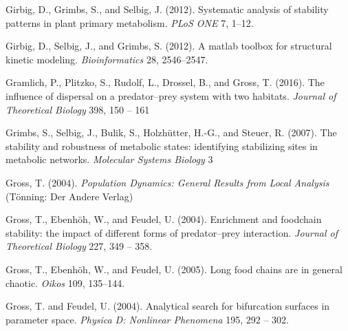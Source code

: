 \documentclass{article}
\begin{document}
\begin{thebibliography}{85}
Girbig, D., Grimbs, S., and Selbig, J. (2012{}).
\newblock Systematic analysis of stability patterns in plant primary
  metabolism.
\newblock \emph{PLoS ONE} 7, 1--12.
\newblock {}

Girbig, D., Selbig, J., and Grimbs, S. (2012{}).
\newblock A matlab toolbox for structural kinetic modeling.
\newblock \emph{Bioinformatics} 28, 2546--2547.
\newblock {}

Gramlich, P., Plitzko, S., Rudolf, L., Drossel, B., and Gross, T. (2016).
\newblock The influence of dispersal on a predator–prey system with two
  habitats.
\newblock \emph{Journal of Theoretical Biology} 398, 150 -- 161

Grimbs, S., Selbig, J., Bulik, S., Holzh\"utter, H.-G., and Steuer, R. (2007).
\newblock The stability and robustness of metabolic states: identifying
  stabilizing sites in metabolic networks.
\newblock \emph{Molecular Systems Biology} 3

Gross, T. (2004).
\newblock \emph{Population Dynamics: General Results from Local Analysis}
  (T\"{o}nning: Der Andere Verlag)

Gross, T., Ebenh\"oh, W., and Feudel, U. (2004).
\newblock Enrichment and foodchain stability: the impact of different forms of
  predator–prey interaction.
\newblock \emph{Journal of Theoretical Biology} 227, 349 -- 358.
\newblock {}

Gross, T., Ebenh\"oh, W., and Feudel, U. (2005).
\newblock Long food chains are in general chaotic.
\newblock \emph{Oikos} 109, 135--144.
\newblock {}

Gross, T. and Feudel, U. (2004).
\newblock Analytical search for bifurcation surfaces in parameter space.
\newblock \emph{Physica D: Nonlinear Phenomena} 195, 292 -- 302.
\newblock {}


\end{thebibliography}
\end{document}
